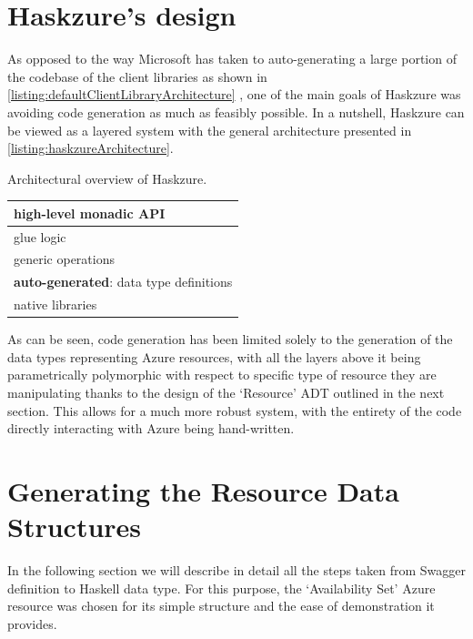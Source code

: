 \documentclass[11pt]{report}
\begin{document}
\section{Haskzure's design}

As opposed to the way Microsoft has taken to auto-generating a large portion of
the codebase of the client libraries as shown in
\autoref{listing:defaultClientLibraryArchitecture} , one of the main goals of
Haskzure was avoiding code generation as much as feasibly possible. \newline
In a nutshell, Haskzure can be viewed as a layered system with the general
architecture presented in \autoref{listing:haskzureArchitecture}.

\begin{listing}[H]
\caption{Architectural overview of Haskzure.}
\label{listing:haskzureArchitecture}
\begin{center}
    \begin{tabular}{ | p{7.5cm} | }
        \hline
        high-level monadic API \\ \hline
        glue logic \\ \hline
        generic operations \\ \hline
        \textbf{auto-generated}: data type definitions \\ \hline
        native libraries \\ \hline
    \end{tabular}
\end{center}
\end{listing}

As can be seen, code generation has been limited solely to the generation of
the data types representing Azure resources, with all the layers above it being
parametrically polymorphic with respect to specific type of resource they are
manipulating thanks to the design of the `Resource' ADT outlined in the next
section. This allows for a much more robust system, with the entirety of the
code directly interacting with Azure being hand-written.

\section{Generating the Resource Data Structures}

In the following section we will describe in detail all the steps taken from
Swagger definition to Haskell data type. For this purpose, the
`Availability Set' Azure resource was chosen for its simple structure and
the ease of demonstration it provides.
\end{document}
